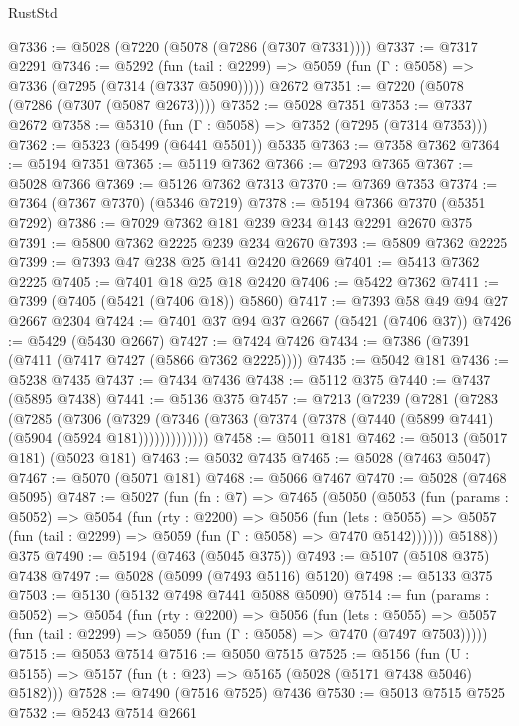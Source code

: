 \begin{lexlean}{RustStd}
\begin{coremodule}
{\begin{coremodule}
{{{{{{{{{{{{@7336 := @5028 (@7220 (@5078 (@7286 (@7307 @7331))))
@7337 := @7317 @2291
@7346 := @5292
    (fun (tail : @2299) => @5059 (fun (Γ : @5058) => @7336 (@7295 (@7314 (@7337 @5090)))))
    @2672
@7351 := @7220 (@5078 (@7286 (@7307 (@5087 @2673))))
@7352 := @5028 @7351
@7353 := @7337 @2672
@7358 := @5310 (fun (Γ : @5058) => @7352 (@7295 (@7314 @7353)))
@7362 := @5323 (@5499 (@6441 @5501)) @5335
@7363 := @7358 @7362
@7364 := @5194 @7351
@7365 := @5119 @7362
@7366 := @7293 @7365
@7367 := @5028 @7366
@7369 := @5126 @7362 @7313
@7370 := @7369 @7353
@7374 := @7364 (@7367 @7370) (@5346 @7219)
@7378 := @5194 @7366 @7370 (@5351 @7292)
@7386 := @7029 @7362 @181 @239 @234 @143 @2291 @2670 @375
@7391 := @5800 @7362 @2225 @239 @234 @2670
@7393 := @5809 @7362 @2225
@7399 := @7393 @47 @238 @25 @141 @2420 @2669
@7401 := @5413 @7362 @2225
@7405 := @7401 @18 @25 @18 @2420
@7406 := @5422 @7362
@7411 := @7399 (@7405 (@5421 (@7406 @18)) @5860)
@7417 := @7393 @58 @49 @94 @27 @2667 @2304
@7424 := @7401 @37 @94 @37 @2667 (@5421 (@7406 @37))
@7426 := @5429 (@5430 @2667)
@7427 := @7424 @7426
@7434 := @7386 (@7391 (@7411 (@7417 @7427 (@5866 @7362 @2225))))
@7435 := @5042 @181
@7436 := @5238 @7435
@7437 := @7434 @7436
@7438 := @5112 @375
@7440 := @7437 (@5895 @7438)
@7441 := @5136 @375
@7457 := @7213
    (@7239
      (@7281
        (@7283
          (@7285
            (@7306
              (@7329
                (@7346 (@7363 (@7374 (@7378 (@7440 (@5899 @7441) (@5904 (@5924 @181)))))))))))))
@7458 := @5011 @181
@7462 := @5013 (@5017 @181) (@5023 @181)
@7463 := @5032 @7435
@7465 := @5028 (@7463 @5047)
@7467 := @5070 (@5071 @181)
@7468 := @5066 @7467
@7470 := @5028 (@7468 @5095)
@7487 := @5027
    (fun (fn : @7) =>
    @7465
      (@5050
        (@5053
          (fun (params : @5052) =>
          @5054
            (fun (rty : @2200) =>
            @5056
              (fun (lets : @5055) =>
              @5057 (fun (tail : @2299) => @5059 (fun (Γ : @5058) => @7470 @5142))))))
        @5188))
    @375
@7490 := @5194 (@7463 (@5045 @375))
@7493 := @5107 (@5108 @375) @7438
@7497 := @5028 (@5099 (@7493 @5116) @5120)
@7498 := @5133 @375
@7503 := @5130 (@5132 @7498 @7441 @5088 @5090)
@7514 := fun (params : @5052) =>
  @5054
    (fun (rty : @2200) =>
    @5056
      (fun (lets : @5055) =>
      @5057 (fun (tail : @2299) => @5059 (fun (Γ : @5058) => @7470 (@7497 @7503)))))
@7515 := @5053 @7514
@7516 := @5050 @7515
@7525 := @5156 (fun (U : @5155) => @5157 (fun (t : @23) => @5165 (@5028 (@5171 @7438 @5046) @5182)))
@7528 := @7490 (@7516 @7525) @7436
@7530 := @5013 @7515 @7525
@7532 := @5243 @7514 @2661
}}}}}}}}}}}}
\end{coremodule}}
\end{coremodule}
\end{lexlean}
